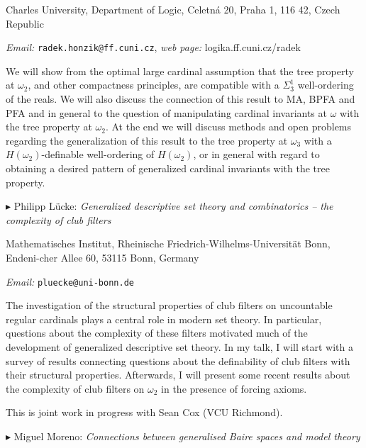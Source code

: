 \documentclass[a4paper]{amsart}
\theoremstyle{remark}
\newcommand{\vsp}{\vspace{20pt}}
\begin{document}
\noindent 
Charles University, Department of Logic,
Celetn{\' a} 20, Praha 1, 
116 42, Czech Republic 

\noindent 
\emph{Email:} \texttt{radek.honzik@ff.cuni.cz}, \emph{web page:} logika.ff.cuni.cz/radek  

We will show from the optimal large cardinal assumption that the tree property at $\omega_2$, and other compactness principles, are compatible with a $\Sigma^1_3$ well-ordering of the reals. We will also discuss the connection of this result to MA, BPFA and PFA and in general to the question of manipulating cardinal invariants at $\omega$ with the tree property at $\omega_2$. At the end we will discuss methods and open problems regarding the generalization of this result to the tree property at $\omega_3$ with a $H(\omega_2)$-definable well-ordering of $H(\omega_2)$, or in general with regard to obtaining a desired pattern of generalized cardinal invariants with the tree property.







\vsp 

\noindent 
$\blacktriangleright$ Philipp L\"ucke: \emph{Generalized descriptive set theory and combinatorics -- the complexity of club filters} 

\noindent 
Mathematisches Institut, Rheinische Friedrich-Wilhelms-Universit\"at Bonn, Endeni-cher Allee 60, 53115 Bonn, Germany 

\noindent 
\emph{Email:} \texttt{pluecke@uni-bonn.de}

The investigation of the structural properties of club filters on uncountable regular cardinals plays a central role in modern set theory.    
In particular, questions about the complexity of these filters motivated much of the development of generalized descriptive set theory. In my talk, I will start with a survey of results connecting questions about the definability of club filters with their  structural properties. Afterwards, I will present some recent results about the complexity of club filters on $\omega_2$ in the presence of forcing axioms. 

This is joint work in progress with Sean Cox (VCU Richmond). 








\vsp 

\noindent 
$\blacktriangleright$ Miguel Moreno: \emph{Connections between generalised Baire spaces and model theory} 
\end{document}
